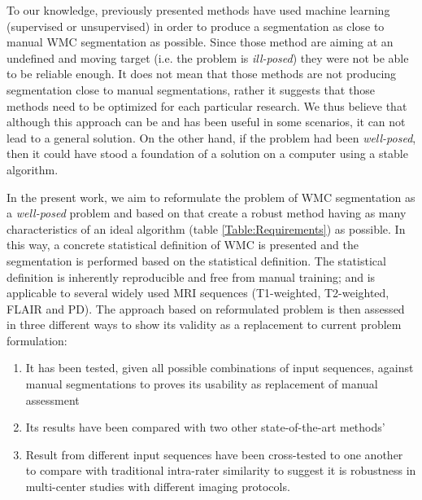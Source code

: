 To our knowledge, previously presented methods have used machine learning (supervised or unsupervised) in order to produce a segmentation as close to manual WMC segmentation as possible. Since those method are aiming at an undefined and moving target (i.e. the problem is \textit{ill-posed}) they were not be able to be reliable enough. It does not mean that those methods are not producing segmentation close to manual segmentations, rather it suggests that those methods need to be optimized for each particular research. We thus believe that although this approach can be and has been useful in some scenarios, it can not lead to a general solution. On the other hand, if the problem had been \textit{well-posed}, then it could have stood a foundation of a solution on a computer using a stable algorithm.

In the present work, we aim to reformulate the problem of WMC segmentation as a \textit{well-posed} problem and based on that create a robust method having as many characteristics of an ideal algorithm (table \ref{Table:Requirements}) as possible. In this way, a concrete statistical definition of WMC is presented and the segmentation is performed based on the statistical definition. The statistical definition is inherently reproducible and free from manual training; and is applicable to several widely used MRI sequences (T1-weighted, T2-weighted, FLAIR and PD). The approach based on reformulated problem is then assessed in three different ways to show its validity as a replacement to current problem formulation:

\begin{enumerate}
\item It has been tested, given all possible combinations of input sequences, against manual segmentations to proves its usability as replacement of manual assessment
\item Its results have been compared with two other state-of-the-art methods'
\item Result from different input sequences have been cross-tested to one another to compare with traditional intra-rater similarity to suggest it is robustness in multi-center studies with different imaging protocols. 
\end{enumerate}

